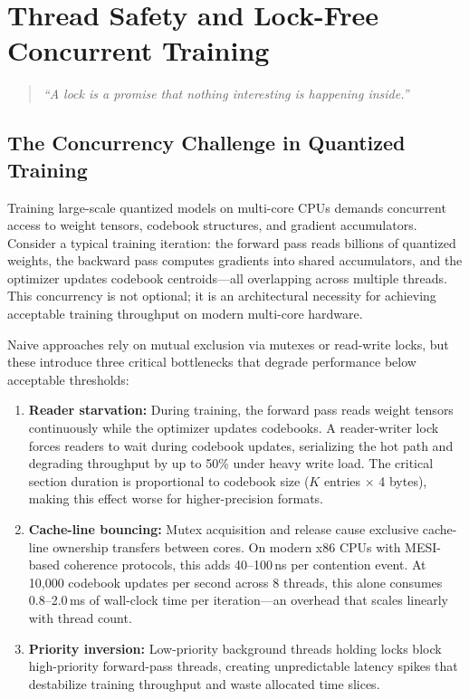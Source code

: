 
\chapter{Thread Safety and Lock-Free Concurrent Training}
\label{ch:thread_safety}

\begin{quote}
\textit{``A lock is a promise that nothing interesting is happening inside.''}
\end{quote}

\section{The Concurrency Challenge in Quantized Training}
\label{sec:concurrency_challenge}

Training large-scale quantized models on multi-core CPUs demands concurrent access to weight tensors, codebook structures, and gradient accumulators. Consider a typical training iteration: the forward pass reads billions of quantized weights, the backward pass computes gradients into shared accumulators, and the optimizer updates codebook centroids---all overlapping across multiple threads. This concurrency is not optional; it is an architectural necessity for achieving acceptable training throughput on modern multi-core hardware.

Naive approaches rely on mutual exclusion via mutexes or read-write locks, but these introduce three critical bottlenecks that degrade performance below acceptable thresholds:

\begin{enumerate}
    \item \textbf{Reader starvation:} During training, the forward pass reads weight tensors continuously while the optimizer updates codebooks. A reader-writer lock forces readers to wait during codebook updates, serializing the hot path and degrading throughput by up to 50\% under heavy write load. The critical section duration is proportional to codebook size ($K$ entries $\times$ 4 bytes), making this effect worse for higher-precision formats.

    \item \textbf{Cache-line bouncing:} Mutex acquisition and release cause exclusive cache-line ownership transfers between cores. On modern x86 CPUs with MESI-based coherence protocols, this adds 40--100\,ns per contention event. At 10,000 codebook updates per second across 8 threads, this alone consumes 0.8--2.0\,ms of wall-clock time per iteration---an overhead that scales linearly with thread count.

    \item \textbf{Priority inversion:} Low-priority background threads holding locks block high-priority forward-pass threads, creating unpredictable latency spikes that destabilize training throughput and waste allocated time slices.
\end{enumerate}

